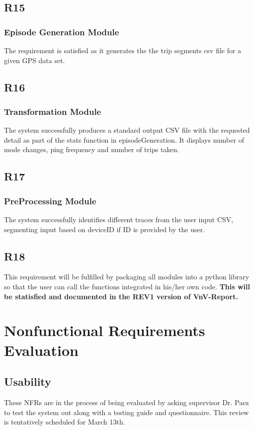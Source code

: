 \documentclass[12pt, titlepage]{article}
\begin{document}
\subsection{R15}
\subsubsection{Episode Generation Module}
The requirement is satisfied as it generates the the trip segments csv file for a given GPS data set.
\subsection{R16}
\subsubsection{Transformation Module}
The system successfully produces a standard output CSV file with the requested detail as part of the stats function in episodeGeneration. It displays number of mode changes, ping frequency and number of trips taken.
\subsection{R17}
\subsubsection{PreProcessing Module}
The system successfully identifies different traces from the user input CSV, segmenting input based on deviceID if ID is provided by the user.
\subsection{R18}
This requirement will be fulfilled by packaging all modules into a python library so that the user can call the functions integrated in his/her own code. \textbf{This will be statisfied and documented in the REV1 version of VnV-Report.}

\section{Nonfunctional Requirements Evaluation}

\subsection{Usability}
These NFRs are in the process of being evaluated by asking supervisor Dr. Paez to test the system out along with a testing guide and questionnaire. This review is tentatively scheduled for March 13th. 
\end{document}
